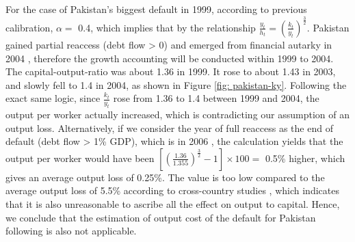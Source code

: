 For the case of Pakistan's biggest default in 1999, according to previous calibration, $\alpha=$ 0.4, which implies that by the relationship $\frac{y_t}{h_t} = \left( \frac{k_t}{y_t} \right)^{\frac{3}{2}}$.
Pakistan gained partial reaccess (debt flow > 0) and emerged from financial autarky in 2004 \citep{trebesch-2011-sovereign}, therefore the growth accounting will be conducted within 1999 to 2004.
The capital-output-ratio was about 1.36 in 1999. It rose to about 1.43 in 2003, and slowly fell to 1.4 in 2004, as shown in Figure \ref{fig: pakistan-ky}.
Following the exact same logic, since $\frac{k_t}{y_t}$ rose from 1.36 to 1.4 between 1999 and 2004, the output per worker actually increased, which is contradicting our assumption of an output loss.
Alternatively, if we consider the year of full reaccess as the end of default (debt flow > 1\% GDP), which is in 2006 \citep{trebesch-2011-sovereign}, the calculation yields that the output per worker would have been $ \left[\left(\frac{1.36}{1.355} \right)^{\frac{3}{2}} -1\right]\times 100 = $ 0.5\% higher, which gives an average output loss of 0.25\%. The value is too low compared to the average output loss of 5.5\% according to cross-country studies \citep{Uribe-Schmitt-Grohe-textbook,Borensztein-Panizza-defualt-cost}, which indicates that it is also unreasonable to ascribe all the effect on output to capital.
Hence, we conclude that the estimation of output cost of the default for Pakistan following \citet{zarazaga-12} is also not applicable.


